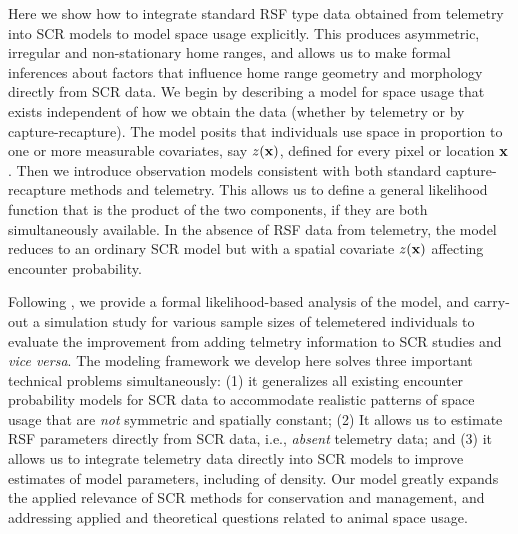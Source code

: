 Here we show how to integrate standard RSF type data obtained from
telemetry into SCR models to model space usage explicitly.  This
produces asymmetric, irregular and non-stationary home ranges, and
allows us to make formal inferences about factors that influence home
range geometry and morphology directly from SCR data.  We begin by
describing a model for space usage that exists independent of how we
obtain the data (whether by telemetry or by capture-recapture). The
model posits that individuals use space in proportion to one or more
measurable covariates, say $z({\bf x})$, defined for every pixel or
location ${\bf x}$.  Then we introduce observation models consistent
with both standard capture-recapture methods and telemetry.  This
allows us to define a general likelihood function that is the product
of the two components, if they are both simultaneously available.  In
the absence of RSF data from telemetry, the model reduces to an
ordinary SCR model but with a spatial covariate $z({\bf x})$ affecting
encounter probability.  

Following \citet{borchers_efford:2008}, we provide a formal
likelihood-based analysis of the model, and carry-out a simulation
study for various sample sizes of telemetered individuals to evaluate
the improvement from adding telmetry information to SCR studies and
{\it vice versa}. 
The modeling framework we develop here solves three important
technical problems simultaneously: (1) it generalizes all existing
encounter probability models for SCR data to accommodate realistic
patterns of space usage that are {\it not} symmetric and spatially
constant;
(2) It allows us to estimate RSF
parameters directly from SCR data, i.e., {\it absent} telemetry data;
and (3) it allows us to integrate telemetry data directly into SCR
models to improve estimates of model parameters, including of density.
Our model greatly expands the applied relevance of SCR methods for
conservation and management, and addressing applied and theoretical
questions related to animal space usage. 

